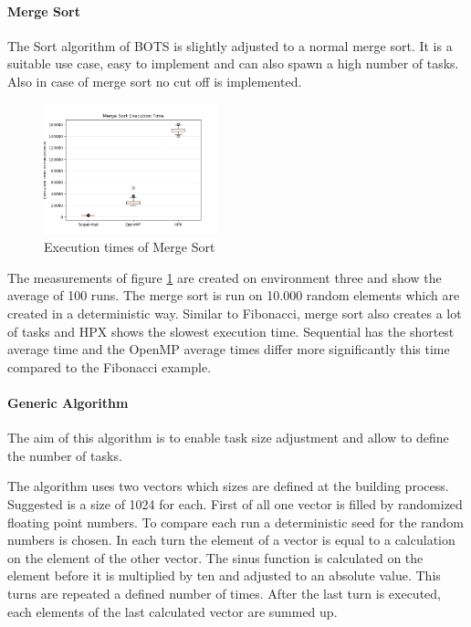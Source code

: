  \paragraph{Merge Sort}
  The Sort algorithm of BOTS is slightly adjusted to a normal merge sort.
  It is a suitable use case, easy to implement and can also spawn a high number of tasks.
  Also in case of merge sort no cut off is implemented.
  \begin{figure}[htbp]
	\centering
	\includegraphics[width=0.45\textwidth]{figures/sort_NoOp.png}
	\caption{Execution times of Merge Sort}
	\label{fig:sort_NoOp}
  \end{figure}
  The measurements of figure \ref{fig:sort_NoOp} are created on environment three and show the average of 100 runs.
  The merge sort is run on 10.000 random elements which are created in a deterministic way.
  Similar to Fibonacci, merge sort also creates a lot of tasks and HPX shows the slowest execution time.
  Sequential has the shortest average time and the OpenMP average times differ more significantly this time compared to the Fibonacci example. 
  \\
  
  \paragraph{Generic Algorithm}
  The aim of this algorithm is to enable task size adjustment and allow to define the number of tasks.
  
  The algorithm uses two vectors which sizes are defined at the building process.
  Suggested is a size of 1024 for each.
  First of all one vector is filled by randomized floating point numbers.
  To compare each run a deterministic seed for the random numbers is chosen.
  In each turn the element of a vector is equal to a calculation on the element of the other vector.
  The sinus function is calculated on the element before it is multiplied by ten and adjusted to an absolute value.
  This turns are repeated a defined number of times.
  After the last turn is executed, each elements of the last calculated vector are summed up.
  
